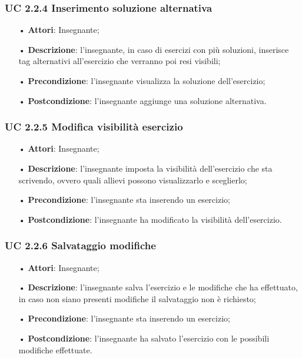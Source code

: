 \subsubsection{UC 2.2.4 Inserimento soluzione alternativa}
\begin{itemize}
	\item[•] \textbf{Attori}: Insegnante;
	\item[•] \textbf{Descrizione}: l'insegnante, in caso di esercizi con più soluzioni, inserisce tag alternativi all'esercizio che verranno poi resi visibili;
	\item[•] \textbf{Precondizione}: l'insegnante visualizza la soluzione dell'esercizio;
	\item[•] \textbf{Postcondizione}: l'insegnante aggiunge una soluzione alternativa.
\end{itemize}


\subsubsection{UC 2.2.5 Modifica visibilità esercizio}
\begin{itemize}
	\item[•] \textbf{Attori}: Insegnante;
	\item[•] \textbf{Descrizione}: l'insegnante imposta la visibilità dell'esercizio che sta scrivendo, ovvero quali allievi possono visualizzarlo e sceglierlo;
	\item[•] \textbf{Precondizione}: l'insegnante sta inserendo un esercizio;
	\item[•] \textbf{Postcondizione}: l'insegnante ha modificato la visibilità dell'esercizio.
\end{itemize}


\subsubsection{UC 2.2.6 Salvataggio modifiche}
\begin{itemize}
	\item[•] \textbf{Attori}: Insegnante;
	\item[•] \textbf{Descrizione}: l'insegnante salva l'esercizio e le modifiche che ha effettuato, in caso non siano presenti modifiche il salvataggio non è richiesto;
	\item[•] \textbf{Precondizione}: l'insegnante sta inserendo un esercizio;
	\item[•] \textbf{Postcondizione}: l'insegnante ha salvato l'esercizio con le possibili modifiche effettuate.
\end{itemize}


